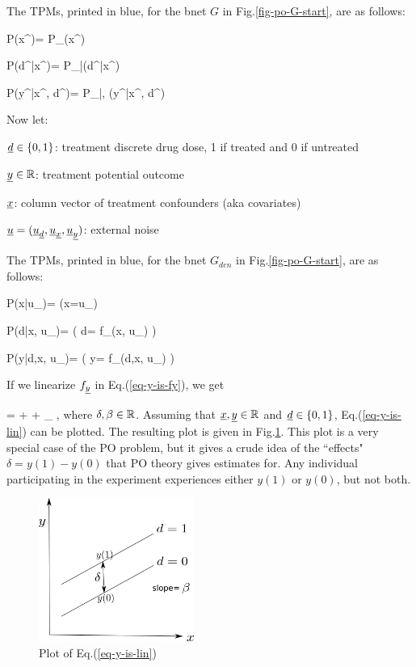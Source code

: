 The TPMs, printed in blue,
for the bnet
$G$
in Fig.\ref{fig-po-G-start},
are as follows:


\beq\color{blue}
P(x^\s)=
P_{\rvx}(x^\s)
\eeq

\beq\color{blue}
P(d^\s|x^\s)=
P_{\rvd|\rvx}(d^\s|x^\s)
\eeq


\beq\color{blue}
P(y^\s|x^\s, d^\s)=
P_{\rvy|\rvx, \rvd}(y^\s|x^\s, d^\s)
\eeq




Now let:

${\underline{d}}\in\{0,1\}$: treatment discrete drug dose,  1 if treated and 0 if untreated

${\underline{y}}\in { \mathbb{R}}$:
 treatment potential outcome

${\underline{x}}$: column vector of 
treatment
confounders (aka covariates)


${\underline{u}}=({\underline{u}}_{\underline{d}}, {\underline{u}}_{\underline{x}}, {\underline{u}}_{\underline{y}})$:
external noise

The TPMs, printed in blue,
for the bnet
$G_{den}$
in Fig.\ref{fig-po-G-start},
are as follows:


\beq \color{blue}
P(x|u_\rvx)= \indi(\;\;x=u_\rvx\;\;)
\eeq

\beq\color{blue}
P(d|x, u_\rvd)=
\indi( \;\; d= f_\rvd(x, u_\rvd)
\;\;)
\eeq

\beq\color{blue}
P(y|d,x, u_\rvy)=
\indi( \;\; y= f_\rvy(d,x, u_\rvy)
\;\;)
\label{eq-y-is-fy}
\eeq

If we linearize
 $f_{\underline{y}}$ in Eq.(\ref{eq-y-is-fy}),
we get

\beqa
\rvy =
\delta \rvd + \beta \rvx + \rvu_\rvy
\;,
\label{eq-y-is-lin}
\eeqa
where $\delta, \beta\in { \mathbb{R}}$.
Assuming
that ${\underline{x}}, {\underline{y}}\in { \mathbb{R}}$
and ${\underline{d}}\in \{0,1\}$,
Eq.(\ref{eq-y-is-lin}) can be plotted.
The resulting plot
is given in Fig.\ref{fig-po-two-parallel-lines}.
This plot
is a very special
case of the PO problem,
but it gives a crude idea
of the ``effects" $\delta
= y(1)-y(0)$ that PO theory 
gives estimates for.
Any 
individual participating in the experiment
experiences either $y(1)$
or $y(0)$,
but not both.



\begin{figure}[h!]
\centering
\includegraphics[width=2in]
{pot-out/two-parallel-lines.png}
\caption{Plot  of
Eq.(\ref{eq-y-is-lin})} 
\label{fig-po-two-parallel-lines}
\end{figure}




